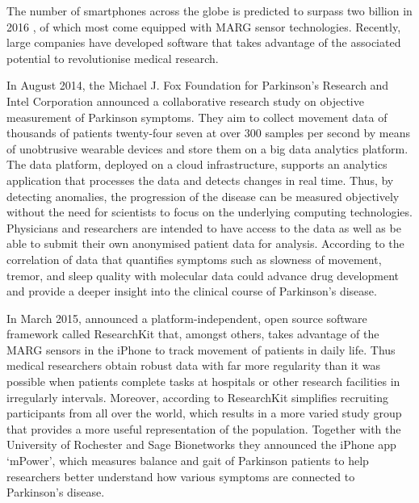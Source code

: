 The number of smartphones across the globe is predicted to surpass two billion in 2016 \cite{emarketer_smartphones}, of which most come equipped with MARG sensor technologies. Recently, large companies have developed software that takes advantage of the associated potential to revolutionise medical research.

In August 2014, the Michael J. Fox Foundation for Parkinson’s Research and Intel Corporation \cite{Intel_2013} announced a collaborative research study on objective measurement of Parkinson symptoms. They aim to collect movement data of thousands of patients twenty-four seven at over 300 samples per second by means of unobtrusive wearable devices and store them on a big data analytics platform. The data platform, deployed on a cloud infrastructure, supports an analytics application that processes the data and detects changes in real time. Thus, by detecting anomalies, the progression of the disease can be measured objectively without the need for scientists to focus on the underlying computing technologies. Physicians and researchers are intended to have access to the data as well as be able to submit their own anonymised patient data for analysis. According to \cite{Intel_2013} the correlation of data that quantifies symptoms such as slowness of movement, tremor, and sleep quality with molecular data could advance drug development and provide a deeper insight into the clinical course of Parkinson's disease.

In March 2015, \citeauthor{Apple_2015} announced a platform-independent, open source software framework called ResearchKit \cite{Apple_2015} that, amongst others, takes advantage of the MARG sensors in the iPhone to track movement of patients in daily life. Thus medical researchers obtain robust data with far more regularity than it was possible when patients complete tasks at hospitals or other research facilities in irregularly intervals. Moreover, according to \citeauthor{Apple_2015} ResearchKit simplifies recruiting participants from all over the world, which results in a more varied study group that provides a more useful representation of the population. Together with the University of Rochester and Sage Bionetworks they announced the iPhone app `mPower', which measures balance and gait of Parkinson patients to help researchers better understand how various symptoms are connected to Parkinson's disease.

